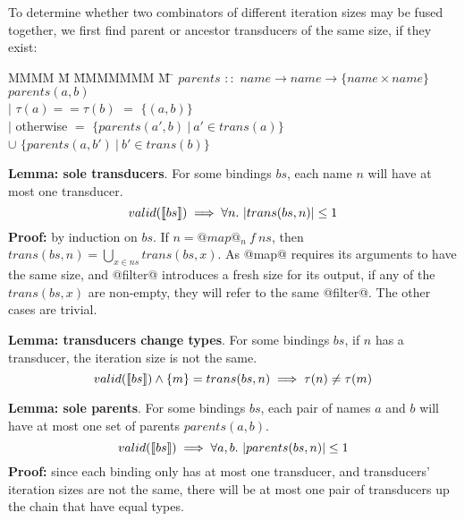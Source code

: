 To determine whether two combinators of different iteration sizes may be fused together, we first find parent or ancestor transducers of the same size, if they exist:
\begin{tabbing}
MMMM \= M \= MMMMMMM \= M \= \kill
$parents$ \> $::$ \> $name \to name \to \{name \times name\}$ \\
$parents(a,b)$ \\
        \> $|$ \> $\tau(a) == \tau(b)$ \> $=$    \> $\{(a, b)\}$ \\
        \> $|$ \> otherwise            \> $=$    \> $\{ parents(a', b) ~|~ a' \in trans(a) \} $      \\
        \>     \>                      \> $\cup$ \> $\{ parents(a, b') ~|~ b' \in trans(b) \} $  \\
\end{tabbing}

\textbf{Lemma: sole transducers}.
For some bindings $bs$, each name $n$ will have at most one transducer.
\[
valid(\constr{bs}) \implies \forall n.\ |trans(bs, n)| \le 1
\]
\textbf{Proof:} by induction on $bs$. If $n = @map@_n~f~ns$,
then $trans(bs,n) = \bigcup_{x \in ns} trans(bs,x)$.
As @map@ requires its arguments to have the same size, and @filter@ introduces a fresh size for its output,
if any of the $trans(bs,x)$ are non-empty, they will refer to the same @filter@.
The other cases are trivial.

\textbf{Lemma: transducers change types}.
For some bindings $bs$, if $n$ has a transducer, the iteration size is not the same.
\[
valid(\llbracket bs \rrbracket) \wedge \{m\} = trans(bs, n) \implies \tau(n) \not= \tau(m)
\]

\textbf{Lemma: sole parents}.
For some bindings $bs$, each pair of names $a$ and $b$ will have at most one set of parents $parents(a,b)$.
\[
valid(\constr{bs}) \implies \forall a,b.\ |parents(bs, n)| \le 1
\]
\textbf{Proof:} since each binding only has at most one transducer, and transducers' iteration sizes are not the same, there will be at most one pair of transducers up the chain that have equal types.

